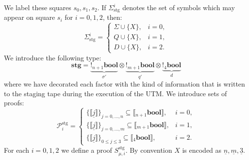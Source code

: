 \documentclass[english,letter paper,12pt,reqno]{article}
\theoremstyle{definition}
\begin{document}
We label these squares $s_0, s_1, s_2$. If $\Sigma_{\text{stg}}^i$ denotes the set of symbols which may appear on square $s_i$ for $i =0,1,2$, then:
\begin{equation}
\Sigma_{\text{stg}}^i =
    \begin{cases}
        \Sigma \cup \{X\},& i =0,\\
        Q \cup \{X\},& i =1,\\
        D \cup \{X\},& i =2.
    \end{cases}
\end{equation}
We introduce the following type:
\begin{equation}
    \textbf{stg} = \underset{\sigma'}{\underbrace{{!}{}_{n+1}\textbf{bool}}} \otimes \underset{q'}{\underbrace{{!}{}_{m+1}\textbf{bool}}} \otimes \underset{d}{\underbrace{{!}{}_{4}\textbf{bool}}}
\end{equation}
where we have decorated each factor with the kind of information that is written to the staging tape during the execution of the UTM. We introduce sets of proofs:
\begin{equation}
    \mathcal{P}_i^{\text{stg}} =
    \begin{cases}
        \{ \llbracket \underline{j} \rrbracket \}_{j = 0, \ldots, n} \subseteq \llbracket {}_{n+1}\textbf{bool}\rrbracket,& i = 0,\\
        \{ \llbracket \underline{j} \rrbracket \}_{j = 0, \ldots, m} \subseteq \llbracket {}_{m+1}\textbf{bool}\rrbracket,& i = 1,\\
        \{ \llbracket \underline{j} \rrbracket \}_{0 \le j \le 3} \subseteq \llbracket {}_{4}\textbf{bool}\rrbracket,& i = 2.
    \end{cases}
\end{equation}
For each $i = 0,1,2$ we define a proof $S^{\text{stg}}_{\mu,i}$. By convention $X$ is encoded as $\underline{n}, \underline{m}, \underline{3}$.
\end{document}
